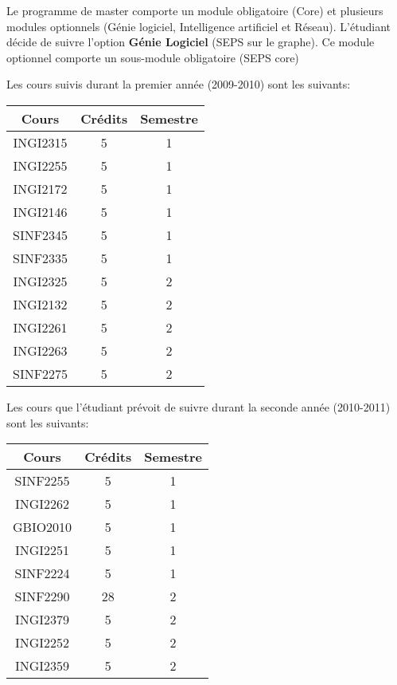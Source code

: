 Le programme de master comporte un module obligatoire (Core) et plusieurs modules optionnels (Génie logiciel, Intelligence artificiel et Réseau). L'étudiant décide de suivre l'option \textbf{Génie Logiciel} (SEPS sur le graphe). Ce module optionnel comporte un sous-module obligatoire (SEPS core)

Les cours suivis durant la premier année (2009-2010) sont les suivants:

\begin{table}[H]
\centering
\begin{tabular}{|c|c|c|}
\hline
\textbf{Cours} & \textbf{Crédits} & \textbf{Semestre}\\
\hline
INGI2315 & 5 & 1 \\
\hline
INGI2255 & 5 & 1 \\
\hline
INGI2172 & 5 & 1 \\
\hline
INGI2146 & 5 & 1 \\
\hline
SINF2345 & 5 & 1 \\
\hline
SINF2335 & 5 & 1 \\
\hline
INGI2325 & 5 & 2 \\
\hline
INGI2132 & 5 & 2 \\
\hline
INGI2261 & 5 & 2 \\
\hline
INGI2263 & 5 & 2 \\
\hline
SINF2275 & 5 & 2\\
\hline
\end{tabular}
\end{table}

Les cours que l'étudiant prévoit de suivre durant la seconde année (2010-2011) sont les suivants:

\begin{table}[H]
\centering
\begin{tabular}{|c|c|c|}
\hline
\textbf{Cours} & \textbf{Crédits} & \textbf{Semestre}\\
\hline
SINF2255 & 5 & 1\\
\hline
INGI2262 & 5 & 1\\
\hline
GBIO2010 & 5 & 1\\
\hline
INGI2251 & 5 & 1\\
\hline
SINF2224 & 5 & 1\\
\hline
SINF2290 &28 & 2 \\
\hline
INGI2379 & 5 & 2\\
\hline
INGI2252 & 5 & 2\\
\hline
INGI2359 & 5 & 2\\
\hline
\end{tabular}
\end{table}



